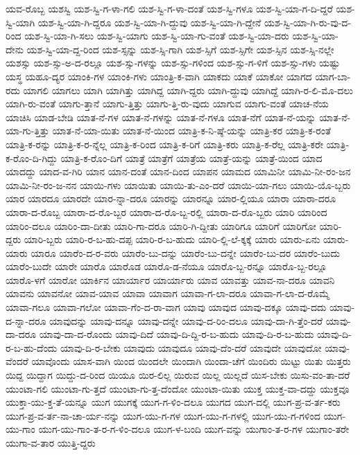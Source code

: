 {ಯವ-ರೊಬ್ಬ
ಯಶಸ್ವಿ
ಯಶ-ಸ್ವಿ-ಗ-ಳಾ-ಗಲಿ
ಯಶ-ಸ್ವಿ-ಗ-ಳಾ-ದಂತೆ
ಯಶ-ಸ್ವಿ-ಗಳೂ
ಯಶ-ಸ್ವಿ-ಯಾ-ಗ-ದಿ-ದ್ದರೆ
ಯಶ-ಸ್ವಿ-ಯಾಗಿ
ಯಶ-ಸ್ವಿ-ಯಾ-ಗಿ-ದ್ದರೂ
ಯಶ-ಸ್ವಿ-ಯಾ-ಗಿ-ದ್ದುವು
ಯಶ-ಸ್ವಿ-ಯಾ-ಗಿ-ದ್ದೇನೆ
ಯಶ-ಸ್ವಿ-ಯಾ-ಗಿ-ರು-ವು-ದ-ರಿಂದ
ಯಶ-ಸ್ವಿ-ಯಾ-ಗಿ-ಸಲು
ಯಶ-ಸ್ವಿ-ಯಾಗು
ಯಶ-ಸ್ವಿ-ಯಾ-ಗು-ವಂತೆ
ಯಶ-ಸ್ವಿ-ಯಾ-ದರು
ಯಶ-ಸ್ವಿ-ಯಾ-ದೇನು
ಯಶ-ಸ್ವಿ-ಯಾ-ದ್ದ-ರಿಂದ
ಯಶ-ಸ್ಸನ್ನು
ಯಶ-ಸ್ಸಿ-ಗಾಗಿ
ಯಶ-ಸ್ಸಿಗೆ
ಯಶ-ಸ್ಸಿಗೇ
ಯಶ-ಸ್ಸಿನ
ಯಶ-ಸ್ಸಿ-ನಲ್ಲೇ
ಯಶಸ್ಸು
ಯಶ-ಸ್ಸು-ಅ-ದ-ರಲ್ಲೂ
ಯಶ-ಸ್ಸು-ಗಳನ್ನು
ಯಶ-ಸ್ಸು-ಗಳಿಂದ
ಯಶ-ಸ್ಸು-ಗ-ಳಿಗೆ
ಯಶ-ಸ್ಸು-ಗಳು
ಯಷ್ಟು
ಯಸ್ಥ
ಯಹೂ-ದ್ಯರ
ಯಾಂಕಿ-ಗಳ
ಯಾಂಕಿ-ಗಳು
ಯಾಂತ್ರಿ-ಕ-ವಾಗಿ
ಯಾಕದು
ಯಾಕೆ
ಯಾಕೋ
ಯಾಗದ
ಯಾಗ-ಬಾ-ರದು
ಯಾಗಲಿ
ಯಾಗಲು
ಯಾಗಿ
ಯಾಗಿತ್ತು
ಯಾಗಿದ್ದ
ಯಾಗಿ-ದ್ದರು
ಯಾಗಿ-ದ್ದುವು
ಯಾಗಿದ್ದೆ
ಯಾಗಿ-ರ-ಲಿ-ಮೊ-ದಲು
ಯಾಗಿ-ರು-ವಂತೆ
ಯಾಗು-ತ್ತಾನೆ
ಯಾಗು-ತ್ತಿತ್ತು
ಯಾಗು-ತ್ತಿ-ರು-ವುದು
ಯಾಗುವ
ಯಾಗು-ವಂತೆ
ಯಾಚ-ನೆಯ
ಯಾಚಿಸಿ
ಯಾಡ-ಬೇಡಿ
ಯಾತ-ನೆ-ಗಳ
ಯಾತ-ನೆ-ಗಳನ್ನು
ಯಾತ-ನೆ-ಗಳೂ
ಯಾತ-ನೆಗೆ
ಯಾತ-ನೆ-ಯನ್ನು
ಯಾತ-ನೆ-ಯಾ-ಗು-ತ್ತಿತ್ತು
ಯಾತ-ನೆ-ಯಾ-ಯಿತು
ಯಾತ-ನೆ-ಯಿಂದ
ಯಾತ್ರಿ-ಕ-ನಿ-ಷ್ಠೆ-ಯನ್ನು
ಯಾತ್ರಿ-ಕರ
ಯಾತ್ರಿ-ಕ-ರಂತೆ
ಯಾತ್ರಿ-ಕ-ರನ್ನು
ಯಾತ್ರಿ-ಕ-ರ-ನ್ನೆಲ್ಲ
ಯಾತ್ರಿ-ಕ-ರಿಂದ
ಯಾತ್ರಿ-ಕ-ರಿಗೆ
ಯಾತ್ರಿ-ಕರು
ಯಾತ್ರಿ-ಕ-ರೆಲ್ಲ
ಯಾತ್ರಿ-ಕರೇ
ಯಾತ್ರಿ-ಕ-ರೊಂ-ದಿ-ಗಿದ್ದು
ಯಾತ್ರಿ-ಕ-ರೊಂ-ದಿಗೆ
ಯಾತ್ರೆ
ಯಾತ್ರೆಗೆ
ಯಾತ್ರೆಯ
ಯಾತ್ರೆ-ಯನ್ನು
ಯಾತ್ರೆ-ಯಿಂದ
ಯಾದ
ಯಾದದ್ದು
ಯಾದ-ವ-ಗಿರಿ
ಯಾನ
ಯಾನ-ದಂತೆ
ಯಾನ-ದಿಂದ
ಯಾಪನ
ಯಾಮದ
ಯಾಮಿನೀ
ಯಾಮಿ-ನೀ-ರಂ-ಜನ
ಯಾಮಿ-ನೀ-ರಂ-ಜ-ನನ
ಯಾಯಿ-ಗಳು
ಯಾಯಿತು
ಯಾಯಿ-ತು-ಎಂ-ದರೆ
ಯಾಯಿ-ಯಾ-ಗಲು
ಯಾಯಿ-ಯೊ-ಬ್ಬರು
ಯಾರ
ಯಾರದೂ
ಯಾರದೇ
ಯಾರ-ನ್ನಾ-ದರೂ
ಯಾರನ್ನು
ಯಾರನ್ನೂ
ಯಾರ-ಲ್ಲಿಯೂ
ಯಾರಾ
ಯಾರಾ-ದರೂ
ಯಾರಾ-ದ-ರೊಬ್ಬ
ಯಾರಾ-ದ-ರೊ-ಬ್ಬರ
ಯಾರಾ-ದ-ರೊ-ಬ್ಬ-ರಲ್ಲಿ
ಯಾರಾ-ದ-ರೊ-ಬ್ಬರು
ಯಾರಿ
ಯಾರಿಂದ
ಯಾರಿಂ-ದಲೂ
ಯಾರಿಂ-ದಾ-ದೀತು
ಯಾರಿ-ಗಾ-ದರೂ
ಯಾರಿ-ಗಿ-ದ್ದೀತು
ಯಾರಿಗೂ
ಯಾರಿಗೆ
ಯಾರಿಗೋ
ಯಾರಿ-ದ್ದರು
ಯಾರಿ-ಬ್ಬರು
ಯಾರಿ-ರ-ಬ-ಹು-ದಪ್ಪ
ಯಾರಿ-ರ-ಬ-ಹುದು
ಯಾರಿ-ಲ್ಲಿ-ಲೆ-ಕ್ಕಕ್ಕೆ
ಯಾರು
ಯಾರು-ಏನು
ಯಾರು-ಯಾರು
ಯಾರೂ
ಯಾರೆಂ-ದ-ರ-ವರು
ಯಾರೆಂ-ಬು-ದನ್ನು
ಯಾರೆಂ-ಬು-ದನ್ನೇ
ಯಾರೆಂ-ಬು-ದರ
ಯಾರೆಂ-ಬುದು
ಯಾರೆಂ-ಬುದೇ
ಯಾರೇ
ಯಾರೊ
ಯಾರೊಡ
ಯಾರೊ-ಡ-ನೆಯೂ
ಯಾರೊ-ಬ್ಬ-ರನ್ನೂ
ಯಾರೊ-ಬ್ಬ-ರಲ್ಲೂ
ಯಾರೊ-ಳಗೆ
ಯಾರೋ
ಯಾರ್ಕಿನ
ಯಾರ್ಯಾರ
ಯಾರ್ಯಾರು
ಯಾವ
ಯಾವತ್ತು
ಯಾವ-ನಾ-ದರೂ
ಯಾವನಿ
ಯಾವನು
ಯಾವನೋ
ಯಾವ-ಯಾವ
ಯಾವಾ
ಯಾವಾಗ
ಯಾವಾ-ಗ-ಲಾ-ದರೂ
ಯಾವಾ-ಗ-ಲಾ-ದ-ರೊಮ್ಮೆ
ಯಾವಾ-ಗಲೂ
ಯಾವಾ-ಗಲೋ
ಯಾವಾ-ಗೆಂ-ದ-ರಾ-ವಾಗ
ಯಾವು
ಯಾವುದ
ಯಾವು-ದಕ್ಕೂ
ಯಾವು-ದದು
ಯಾವು-ದ-ನ್ನಾ-ದರೂ
ಯಾವುದನ್ನು
ಯಾವು-ದನ್ನೂ
ಯಾವು-ದನ್ನೇ
ಯಾವು-ದ-ರಿಂ-ದಲೂ
ಯಾವು-ದಾ-ಗಿ-ತ್ತೆಂ-ದರೆ
ಯಾವು-ದಾ-ದರೂ
ಯಾವು-ದಾ-ದ-ರೊಂದು
ಯಾವು-ದಿದೆ
ಯಾವು-ದಿ-ದ್ದಿ-ರ-ಬ-ಹುದು
ಯಾವು-ದಿ-ರ-ಬ-ಹುದು
ಯಾವು-ದಿ-ರ-ಬ-ಹು-ದೆಂದು
ಯಾವು-ದಿ-ರ-ಬೇಕು
ಯಾವುದು
ಯಾವುದೂ
ಯಾವು-ದೆಂ-ದರೆ
ಯಾವುದೇ
ಯಾವುದೋ
ಯಾವು-ವೆಂದರೆ
ಯಾವೊಂದು
ಯಾಸ-ವಾಗಿ
ಯಿಂದ
ಯಿಂದಲೇ
ಯಿಂದಾಗಿ
ಯಿಂದಾ-ಚೆಗೆ
ಯಿಂದಿರು
ಯಿಟ್ಟು
ಯಿತು
ಯಿತ್ತರು
ಯಿದ್ದ
ಯಿದ್ದಾಗ
ಯಿದ್ದು-ದ-ರಿಂದ
ಯಿಯೂ
ಯಿರ-ಲಿಲ್ಲ
ಯಿರುವ
ಯಿಲ್ಲ
ಯಿಲ್ಲದೆ
ಯಿಸ-ಬೇಕು
ಯಿಸು-ವಂ-ತಾ-ದರೆ
ಯುಂಟಾ-ಗಲಿ
ಯುಂಟಾ-ಗು-ತ್ತದೆ
ಯುಂಟಾ-ಗು-ತ್ತ-ದೆಂದೋ
ಯುಂಟಾ-ಯಿತು
ಯುಕ್ತ
ಯುಕ್ತ-ವಾ-ದದ್ದು
ಯುಕ್ತವೂ
ಯುಕ್ತಾ-ಯು-ಕ್ತ-ತೆ-ಯನ್ನೂ
ಯುಗ
ಯುಗಕ್ಕೆ
ಯುಗ-ಗ-ಳಿಂ-ದಲೂ
ಯುಗದ
ಯುಗ-ದಲ್ಲಿ
ಯುಗ-ಪ್ರ-ವ-ರ್ತ-ಕರು
ಯುಗ-ಪ್ರ-ವ-ರ್ತ-ನಾ-ಚಾ-ರ್ಯ-ನನ್ನು
ಯುಗ-ಯು-ಗ-ಗಳ
ಯುಗ-ಯು-ಗ-ಗಳಲ್ಲಿ
ಯುಗ-ಯು-ಗ-ಗಳಿಂದ
ಯುಗ-ಯು-ಗಾಂ
ಯುಗ-ಯು-ಗಾಂ-ತ-ರ-ಗ-ಳಿಂ-ದಲೂ
ಯುಗ-ಳ-ಬಂದಿ
ಯುಗ-ವನ್ನು
ಯುಗಾಂ-ತ-ರ-ಗಳ
ಯುಗಾಂ-ತರೇ
ಯುಗಾ-ವ-ತಾರ
ಯುತ್ತಿ-ದ್ದರು
}

